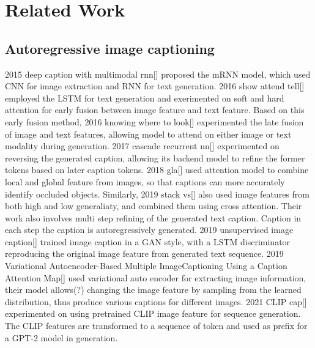 \documentclass{article}
\begin{document}
\section{Related Work}
\label{sec:headings}

\subsection{Autoregressive image captioning}
2015 deep caption with multimodal rnn[] proposed the mRNN model, which used CNN for image extraction and RNN for text generation. 2016 show attend tell[] employed the LSTM for text generation and exerimented on soft and hard attention for early fusion between image feature and text feature. Based on this early fusion method, 2016 knowing where to look[] experimented the late fusion of image and text features, allowing model to attend on either image or text modality during generation. 2017 cascade recurrent nn[] experimented on reversing the generated caption, allowing its backend model to refine the former tokens based on later caption tokens. 2018 gla[] used attention model to combine local and global feature from images, so that captions can more accurately identify occluded objects. Similarly, 2019 stack vs[] also used image features from both high and low generaliaty, and combined them using cross attention. Their work also involves multi step refining of the generated text caption. Caption in each step the caption is autoregressively generated. 2019 unsupervised image caption[] trained image caption in a GAN style, with a LSTM discriminator reproducing the original image feature from generated text sequence. 2019 Variational Autoencoder-Based Multiple ImageCaptioning Using a Caption Attention Map[] used variational auto encoder for extracting image information, their model allows(?) changing the image feature by sampling from the learned distribution, thus produce various captions for different images. 2021 CLIP cap[] experimented on using pretrained CLIP image feature for sequence generation. The CLIP features are transformed to a sequence of token and used as prefix for a GPT-2 model in generation. 
\end{document}
